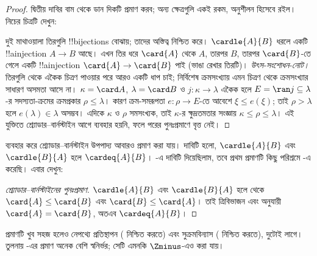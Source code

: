 \documentclass[../../../include/open-logic-section]{subfiles}
\begin{document}
\begin{proof}
দ্বিতীয় দাবির বাম থেকে ডান দিকটি প্রমাণ করব;
অন্য ক্ষেত্রগুলি একই রকম, অনুশীলন হিসেবে রইল।
নিচের চিত্রটি দেখুন:
\begin{center}
\end{center}
দুই মাথাওয়ালা তিরগুলি !!{bijection}s বোঝায়; তাদের অস্তিত্ব
 নিশ্চিত করে। $\cardle{A}{B}$
ধরলে একটি !!a{injection} $A\to B$ আছে। এখন তির ধরে
$\card{A}$ থেকে $A$, তারপর $B$, তারপর $\card{B}$-তে
গেলে একটি !!a{injection} $\card{A}\to\card{B}$ পাই
(ভাঙা রেখার তিরটি)।
\emph{উৎস-সংশোধন-নোট।} তিরগুলি থেকে একৈক চিত্রণ
পাওয়ার পরে আরও একটি ধাপ চাই; নির্বিশেষ ক্রমসংখ্যায়
এমন চিত্রণ থেকে ক্রমসংখ্যার সাধারণ অসমতা আসে না।
$\kappa=\card A$, $\lambda=\card B$ ও $j:\kappa\to\lambda$
একৈক হলে $E=\ran j\subseteq\lambda$-র সদস্যতা-ক্রমের
ক্রমপ্রকার $\rho\leq\lambda$। কারণ ক্রম-সমরূপতা
$e:\rho\to E$-তে আবেশে $\xi\leq e(\xi)$; তাই
$\rho>\lambda$ হলে $e(\lambda)\in\lambda$ অসম্ভব।
এদিকে $\kappa$ ও $\rho$ সমসংখ্যক, তাই $\kappa$-র
ক্ষুদ্রতমতার সংজ্ঞায় $\kappa\leq\rho\leq\lambda$।
এই যুক্তিতে শ্র্যোডার--বার্নস্টাইন আগে ব্যবহার হয়নি,
ফলে পরের পুনঃপ্রমাণে বৃত্ত নেই।
\end{proof}\noindent {} ব্যবহার করে
শ্র্যোডার--বার্নস্টাইন উপপাদ্য আবারও প্রমাণ করা যায়।
দাবিটি হলো, $\cardle{A}{B}$ এবং $\cardle{B}{A}$ হলে
$\cardeq{A}{B}$। -এ
দাবিটি দিয়েছিলাম, তবে প্রথম প্রমাণটি কিছু পরিশ্রমে
-এ করেছি। এবার দেখুন:

\begin{proof}[শ্র্যোডার--বার্নস্টাইনের পুনঃপ্রমাণ]
$\cardle{A}{B}$ এবং $\cardle{B}{A}$ হলে
 থেকে
$\card{A}\leq\card{B}$ এবং $\card{B}\leq\card{A}$।
তাই ত্রিবিভাজন এবং  অনুযায়ী
$\card{A}=\card{B}$, অতএব $\cardeq{A}{B}$।
\end{proof}
\noindent
প্রমাণটি খুব সহজ হলেও নেপথ্যে প্রতিস্থাপন
( নিশ্চিত করতে)
এবং সুক্রমবিন্যাস
( নিশ্চিত করতে), দুটোই
লাগে। তুলনায় -এর
প্রমাণ অনেক বেশি স্বনির্ভর; সেটি এমনকি $\Zminus$-এও করা যায়।
\end{document}
